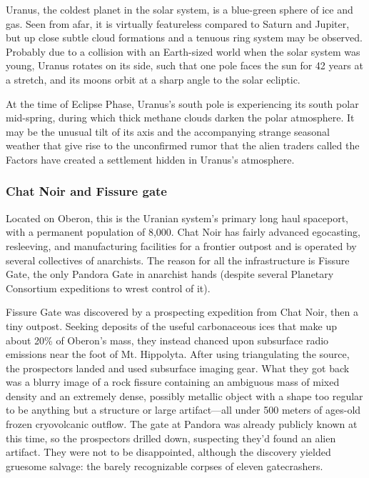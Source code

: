 Uranus, the coldest planet in the solar system, is a blue-green sphere
of ice and gas. Seen from afar, it is virtually featureless compared
to Saturn and Jupiter, but up close subtle cloud formations and a
tenuous ring system may be observed. Probably due to a collision with
an Earth-sized world when the solar system was young, Uranus rotates
on its side, such that one pole faces the sun for 42 years at a
stretch, and its moons orbit at a sharp angle to the solar ecliptic.

At the time of Eclipse Phase, Uranus's south pole
is experiencing its south polar mid-spring, during
which thick methane clouds darken the polar atmosphere. It may be the unusual tilt of its axis and the
accompanying strange seasonal weather that give
rise to the unconfirmed rumor that the alien traders
called the Factors have created a settlement hidden
in Uranus's atmosphere.

\subsubsection{Chat Noir and Fissure gate}
\label{sec:chat-noir-fissure}

Located on Oberon, this is the Uranian system's primary long haul
spaceport, with a permanent population of 8,000. Chat Noir has fairly
advanced egocasting, resleeving, and manufacturing facilities for a
frontier outpost and is operated by several collectives of
anarchists. The reason for all the infrastructure is Fissure Gate, the
only Pandora Gate in anarchist hands (despite several Planetary
Consortium expeditions to wrest control of it).

Fissure Gate was discovered by a prospecting expedition from Chat
Noir, then a tiny outpost. Seeking deposits of the useful carbonaceous
ices that make up about 20\% of Oberon's mass, they instead chanced
upon subsurface radio emissions near the foot of Mt.  Hippolyta. After
using triangulating the source, the prospectors landed and used
subsurface imaging gear.  What they got back was a blurry image of a
rock fissure containing an ambiguous mass of mixed density and an
extremely dense, possibly metallic object with a shape too regular to
be anything but a structure or large artifact—all under 500 meters of
ages-old frozen cryovolcanic outflow. The gate at Pandora was already
publicly known at this time, so the prospectors drilled down,
suspecting they'd found an alien artifact. They were not to be
disappointed, although the discovery yielded gruesome salvage: the
barely recognizable corpses of eleven gatecrashers.

